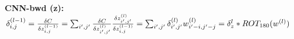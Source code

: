 \textbf{CNN-bwd (z):} $\delta_{i,j}^{(l-1)} 
= \frac{\delta C}{\delta z_{i,j}^{(l-1)}} 
= \sum_{i', j'} \frac{\delta C}{\delta z_{i',j'}^{(l)}} \frac{\delta z_{i',j'}^{(l)}}{\delta z_{i,j}^{(l-1)}} \\
= \sum_{i', j'} \delta_{i',j'}^{(l)} w_{i'-i,j'-j}^{(l)}
= \delta_z^{l} * ROT_{180}(w^{(l)})$\\

\\

